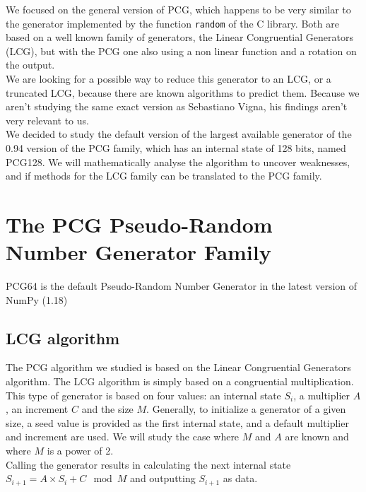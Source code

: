 \documentclass[preprint]{iacrtrans}
\begin{document}
We focused on the general version of PCG, which happens to be very similar to the generator implemented by the function \texttt{random} of the C library. Both are based on a well known family of generators, the Linear Congruential Generators (LCG), but with the PCG one also using a non linear function and a rotation on the output.\\

We are looking for a possible way to reduce this generator to an LCG, or a truncated LCG, because there are known algorithms to predict them. Because we aren't studying the same exact version as Sebastiano Vigna, his findings aren't very relevant to us.\\

We decided to study the default version of the largest available generator of the 0.94 version of the PCG family, which has an internal state of 128 bits, named PCG128. We will mathematically analyse the algorithm to uncover weaknesses, and if methods for the LCG family can be translated to the PCG family.



\section{The PCG Pseudo-Random Number Generator Family}


PCG64 is the default Pseudo-Random Number Generator in the latest version of \textsf{NumPy} (1.18)



\subsection{LCG algorithm}

The PCG algorithm we studied is based on the Linear Congruential Generators algorithm. The LCG algorithm is simply based on a congruential multiplication. This type of generator is based on four values: an internal state $S_{i}$, a multiplier $A$, an increment $C$ and the size $M$. Generally, to initialize a generator of a given size, a seed value is provided as the first internal state, and a default multiplier and increment are used. We will study the case where $M$ and $A$ are known and where $M$ is a power of 2.\\

Calling the generator results in calculating the next internal state $S_{i+1} = A \times S_i + C \mod{M}$ and outputting $S_{i+1}$ as data.
\end{document}
